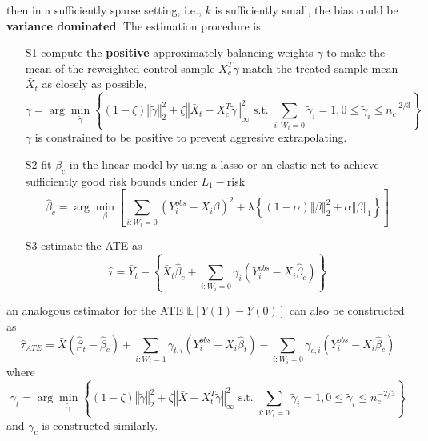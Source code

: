 \documentclass[twoside]{article}
\begin{document}
then in a sufficiently sparse setting, i.e., $k$ is sufficiently small, the bias could be \textbf{variance dominated}. The estimation procedure is 
\begin{itemize}
    \item[S1] compute the \textbf{positive} approximately balancing weights $\gamma$ to make the mean of the reweighted control sample $X^T_c\gamma$ match the treated sample mean $\bar{X}_t$ as closely as possible, 
    \begin{equation*}
        \gamma = \arg\min_{\tilde{\gamma}} \left\{ \left(1-\zeta\right)\left\Vert \tilde{\gamma} \right\Vert^2_2 + \zeta \left\Vert \bar{X}_t- X^T_c\tilde{\gamma} \right\Vert^2_{\infty}\text{ s.t. }\sum_{i:W_i=0}\tilde{\gamma}_i=1,0\leq \tilde{\gamma}_i\leq n_c^{-2/3} \right\}
    \end{equation*}
    $\gamma$ is constrained to be positive to prevent aggresive extrapolating.
    \item[S2] fit $\beta_c$ in the linear model by using a lasso or an elastic net to achieve sufficiently good risk bounds under $L_1-$risk
    \begin{equation*}
        \hat{\beta}_c = \arg \min_{\beta} \left[ \sum_{i:W_i=0} \left(Y_i^{obs}-X_i\beta\right)^2 + \lambda\left\{(1-\alpha)\left\Vert \beta \right\Vert^2_2 + \alpha\left\Vert \beta \right\Vert _1 \right\} \right]
    \end{equation*}
    \item[S3] estimate the ATE as 
    \begin{equation*}
        \hat{\tau} = \bar{Y}_t - \left\{ \bar{X}_t\hat{\beta}_c + \sum_{i:W_i=0} \gamma_i\left(Y^{obs}_i-X_i\hat{\beta}_c\right) \right\}
    \end{equation*}
\end{itemize}
an analogous estimator for the ATE $\mathbb{E}\left[Y(1)-Y(0)\right]$ can also be constructed as 
\begin{equation*}
    \hat{\tau}_{ATE} = \bar{X}\left(\hat{\beta}_t-\hat{\beta}_c\right) + \sum_{i:W_i=1} \gamma_{t,i}\left(Y^{obs}_i-X_i\hat{\beta}_t\right) -\sum_{i:W_i=0} \gamma_{c,i}\left(Y_i^{obs}-X_i\hat{\beta}_c\right)
\end{equation*}
where 
\begin{equation*}
    \gamma_t = \arg\min_{\tilde{\gamma}} \left\{ \left(1-\zeta\right)\left\Vert \tilde{\gamma} \right\Vert^2_2 + \zeta \left\Vert \bar{X}- X^T_t\tilde{\gamma} \right\Vert^2_{\infty}\text{ s.t. }\sum_{i:W_i=0}\tilde{\gamma}_i=1,0\leq \tilde{\gamma}_i\leq n_c^{-2/3} \right\}
\end{equation*}
and $\gamma_c$ is constructed similarly.
\end{document}
